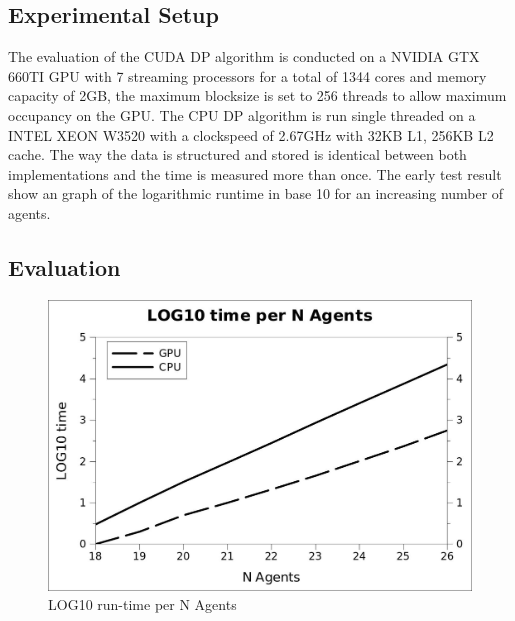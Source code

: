 \documentclass[a4paper, 12pt]{report}
\begin{document}
\subsection{Experimental Setup}
The evaluation of the CUDA DP algorithm is conducted on a NVIDIA GTX 660TI GPU with 7 streaming processors
 for a total of 1344 cores and memory capacity of 2GB, the maximum blocksize is set to 256 threads to allow maximum occupancy on the GPU.
The CPU DP algorithm is run single threaded on a INTEL XEON W3520 with a clockspeed of 2.67GHz with 32KB L1, 256KB L2 cache.
The way the data is structured and stored is identical between both implementations and the time is measured more than once.
The early test result show an graph of the logarithmic runtime in base 10 for an increasing number of agents.


\subsection{Evaluation}

\begin{figure}[htb]
\centering
\includegraphics[width=0.7\linewidth]{loggraph.jpg}
\caption{LOG10 run-time per N Agents\label{log}}
\end{figure}
\end{document}
